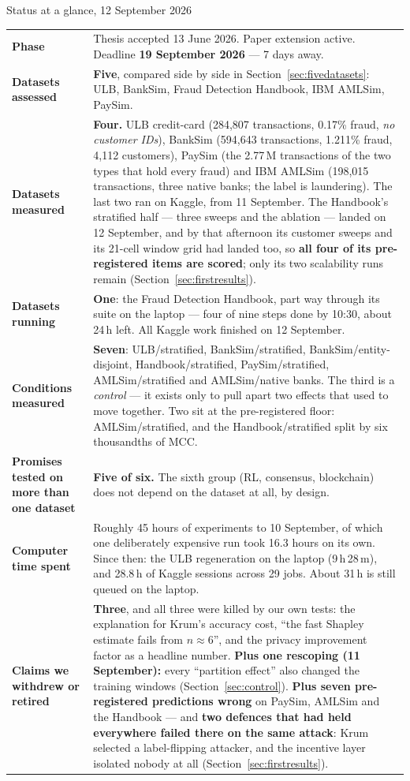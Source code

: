 \documentclass[11pt]{article}
\begin{document}
\begin{keybox}{Status at a glance, 12 September 2026}
\small
\begin{tabularx}{\linewidth}{@{}p{4.7cm} X@{}}
\toprule
\textbf{Phase} & Thesis accepted 13 June 2026. Paper extension active. Deadline \textbf{19 September 2026} --- 7 days away. \\
\textbf{Datasets assessed} & \textbf{Five}, compared side by side in Section~\ref{sec:fivedatasets}: ULB, BankSim, Fraud Detection Handbook, IBM AMLSim, PaySim. \\
\textbf{Datasets measured} & \textbf{Four.} ULB credit-card (284{,}807 transactions, 0.17\% fraud, \emph{no customer IDs}), BankSim (594{,}643 transactions, 1.211\% fraud, 4{,}112 customers), PaySim (the 2.77\,M transactions of the two types that hold every fraud) and IBM AMLSim (198{,}015 transactions, three native banks; the label is laundering). The last two ran on Kaggle, from 11 September. The Handbook's stratified half --- three sweeps and the ablation --- landed on 12 September, and by that afternoon its customer sweeps and its 21-cell window grid had landed too, so \textbf{all four of its pre-registered items are scored}; only its two scalability runs remain (Section~\ref{sec:firstresults}). \\
\textbf{Datasets running} & \textbf{One}: the Fraud Detection Handbook, part way through its suite on the laptop --- four of nine steps done by 10:30, about 24\,h left. All Kaggle work finished on 12 September. \\
\textbf{Conditions measured} & \textbf{Seven}: ULB/stratified, BankSim/stratified, BankSim/entity-disjoint, Handbook/stratified, PaySim/stratified, AMLSim/stratified and AMLSim/native banks. The third is a \emph{control} --- it exists only to pull apart two effects that used to move together. Two sit at the pre-registered floor: AMLSim/stratified, and the Handbook/stratified split by six thousandths of MCC. \\
\textbf{Promises tested on more than one dataset} & \textbf{Five of six.} The sixth group (RL, consensus, blockchain) does not depend on the dataset at all, by design. \\
\textbf{Computer time spent} & Roughly 45 hours of experiments to 10 September, of which one deliberately expensive run took 16.3 hours on its own. Since then: the ULB regeneration on the laptop (9\,h\,28\,m), and 28.8\,h of Kaggle sessions across 29 jobs. About 31\,h is still queued on the laptop. \\
\textbf{Claims we withdrew or retired} & \textbf{Three}, and all three were killed by our own tests: the explanation for Krum's accuracy cost, ``the fast Shapley estimate fails from $n\!\approx\!6$'', and the privacy improvement factor as a headline number. \textbf{Plus one rescoping (11 September):} every ``partition effect'' also changed the training windows (Section~\ref{sec:control}). \textbf{Plus seven pre-registered predictions wrong} on PaySim, AMLSim and the Handbook --- and \textbf{two defences that had held everywhere failed there on the same attack}: Krum selected a label-flipping attacker, and the incentive layer isolated nobody at all (Section~\ref{sec:firstresults}). \\

\end{tabularx}
\end{keybox}
\end{document}
